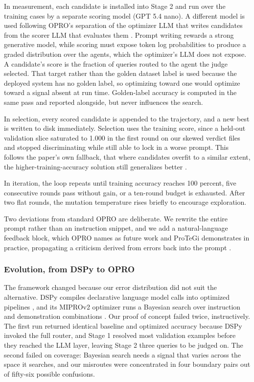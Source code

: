In measurement, each candidate is installed into Stage 2 and run over the training cases by a separate scoring model (GPT 5.4 nano). A different model is used following OPRO's separation of the optimizer LLM that writes candidates from the scorer LLM that evaluates them \autocite{yang2023llmoptimizers}. Prompt writing rewards a strong generative model, while scoring must expose token log probabilities to produce a graded distribution over the agents, which the optimizer's LLM does not expose. A candidate's score is the fraction of queries routed to the agent the judge selected. That target rather than the golden dataset label is used because the deployed system has no golden label, so optimizing toward one would optimize toward a signal absent at run time. Golden-label accuracy is computed in the same pass and reported alongside, but never influences the search.

In selection, every scored candidate is appended to the trajectory, and a new best is written to disk immediately. Selection uses the training score, since a held-out validation slice saturated to 1.000 in the first round on our skewed verdict files and stopped discriminating while still able to lock in a worse prompt. This follows the paper's own fallback, that where candidates overfit to a similar extent, the higher-training-accuracy solution still generalizes better \autocite{yang2023llmoptimizers}.

In iteration, the loop repeats until training accuracy reaches 100 percent, five consecutive rounds pass without gain, or a ten-round budget is exhausted. After two flat rounds, the mutation temperature rises briefly to encourage exploration.

Two deviations from standard OPRO are deliberate. We rewrite the entire prompt rather than an instruction snippet, and we add a natural-language feedback block, which OPRO names as future work and ProTeGi demonstrates in practice, propagating a criticism derived from errors back into the prompt \autocite{pryzant2023protegi,yang2023llmoptimizers}.

\subsubsection{Evolution, from DSPy to OPRO}\label{sec:optimizer-evolution}

The framework changed because our error distribution did not suit the alternative. DSPy compiles declarative language model calls into optimized pipelines \autocite{khattab2024dspy}, and its MIPROv2 optimizer runs a Bayesian search over instruction and demonstration combinations \autocite{opsahlong2024mipro}. Our proof of concept failed twice, instructively. The first run returned identical baseline and optimized accuracy because DSPy invoked the full router, and Stage 1 resolved most validation examples before they reached the LLM layer, leaving Stage 2 three queries to be judged on. The second failed on coverage: Bayesian search needs a signal that varies across the space it searches, and our misroutes were concentrated in four boundary pairs out of fifty-six possible confusions.

